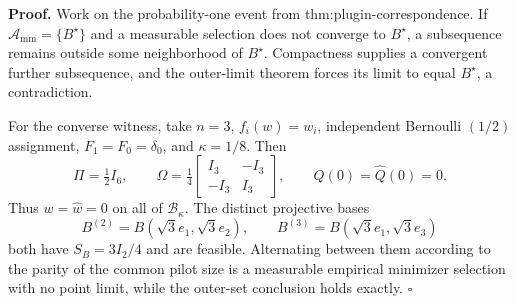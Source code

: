 \textbf{Proof.}
Work on the probability-one event from thm:plugin-correspondence.  If \(\mathcal A_{\mathrm{mm}}=\{B^\star\}\) and a measurable selection does not converge to \(B^\star\), a subsequence remains outside some neighborhood of \(B^\star\).  Compactness supplies a convergent further subsequence, and the outer-limit theorem forces its limit to equal \(B^\star\), a contradiction.

For the converse witness, take \(n=3\), \(f_i(w)=w_i\), independent Bernoulli \((1/2)\) assignment, \(F_1=F_0=\delta_0\), and \(\kappa=1/8\).  Then
\[
\Pi=\tfrac12I_6,
\qquad
\Omega=\tfrac14\begin{bmatrix}I_3&-I_3\\-I_3&I_3\end{bmatrix},
\qquad Q(0)=\widehat Q(0)=0.
\]
Thus \(w=\widehat w=0\) on all of \(\mathcal B_\kappa\).  The distinct projective bases
\[
B^{(2)}=B(\sqrt3e_1,\sqrt3e_2),
\qquad B^{(3)}=B(\sqrt3e_1,\sqrt3e_3)
\]
both have \(S_B=3I_2/4\) and are feasible.  Alternating between them according to the parity of the common pilot size is a measurable empirical minimizer selection with no point limit, while the outer-set conclusion holds exactly. \(\square\)